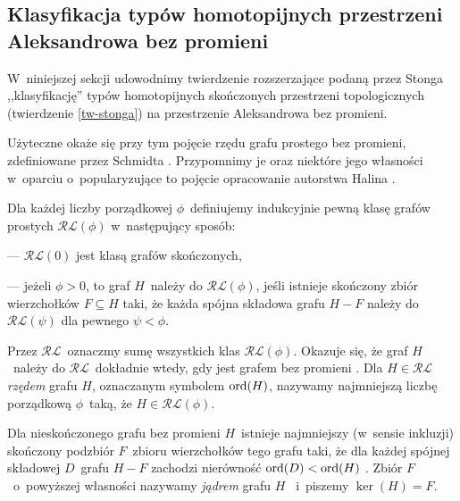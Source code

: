 


\subsection{Klasyfikacja typów homotopijnych przestrzeni Aleksandrowa bez promieni}
W~niniejszej sekcji udowodnimy twierdzenie rozszerzające podaną przez Stonga ,,klasyfikację'' typów homotopijnych skończonych przestrzeni topologicznych (twierdzenie \ref{tw-stonga}) na przestrzenie Aleksandrowa bez promieni.

Użyteczne okaże się przy tym pojęcie rzędu grafu prostego bez promieni, zdefiniowane przez Schmidta \cite{Schmidt83}. Przypomnimy je oraz niektóre jego własności w~oparciu o~popularyzujące to pojęcie opracowanie autorstwa Halina \cite{Halin98}.

Dla każdej liczby porządkowej $\phi$~definiujemy indukcyjnie pewną klasę grafów prostych $\mathcal{RL}(\phi)$ \cite[Definition 3.1]{Halin98} w~następujący sposób:
\begin{compactitem}
\item[---] $\mathcal{RL}(0)$ jest klasą grafów skończonych,
\item[---] jeżeli $\phi>0$, to graf $H$~należy do $\mathcal{RL}(\phi)$, jeśli istnieje skończony zbiór wierzchołków $F\subseteq H$ taki, że każda spójna składowa grafu $H-F$ należy do $\mathcal{RL}(\psi)$ dla pewnego $\psi<\phi$.
\end{compactitem}
Przez $\mathcal{RL}$~oznaczmy sumę wszystkich klas $\mathcal{RL}(\phi)$. Okazuje się, że graf $H$~należy do $\mathcal{RL}$~dokładnie wtedy, gdy jest grafem bez promieni \cite[Proposition 3.2]{Halin98}. Dla $H\in \mathcal{RL}$ \textit{rzędem} grafu $H$, oznaczanym symbolem $\operatorname{ord}(H)$, nazywamy najmniejszą liczbę porządkową $\phi$~taką, że $H\in \mathcal{RL}(\phi)$. 

Dla nieskończonego grafu bez promieni $H$~istnieje najmniejszy (w~sensie inkluzji) skończony podzbiór $F$~zbioru wierzchołków tego grafu taki, że dla każdej spójnej składowej $D$~grafu $H-F$ zachodzi nierówność $\operatorname{ord}(D)<\operatorname{ord}(H)$ \cite[Lemma 3.11]{Halin98}. Zbiór $F$~o~powyższej własności nazywamy \textit{jądrem} grafu $H$ \cite[Definition 3.12]{Halin98}~i~piszemy $\ker(H)=F$. 

